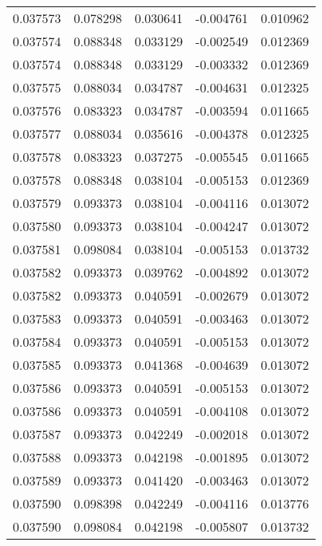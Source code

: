 \begin{tabular}{lrrrr}
0.037573    &  0.078298 &  0.030641 & -0.004761 &             0.010962 \\
0.037574    &  0.088348 &  0.033129 & -0.002549 &             0.012369 \\
0.037574    &  0.088348 &  0.033129 & -0.003332 &             0.012369 \\
0.037575    &  0.088034 &  0.034787 & -0.004631 &             0.012325 \\
0.037576    &  0.083323 &  0.034787 & -0.003594 &             0.011665 \\
0.037577    &  0.088034 &  0.035616 & -0.004378 &             0.012325 \\
0.037578    &  0.083323 &  0.037275 & -0.005545 &             0.011665 \\
0.037578    &  0.088348 &  0.038104 & -0.005153 &             0.012369 \\
0.037579    &  0.093373 &  0.038104 & -0.004116 &             0.013072 \\
0.037580    &  0.093373 &  0.038104 & -0.004247 &             0.013072 \\
0.037581    &  0.098084 &  0.038104 & -0.005153 &             0.013732 \\
0.037582    &  0.093373 &  0.039762 & -0.004892 &             0.013072 \\
0.037582    &  0.093373 &  0.040591 & -0.002679 &             0.013072 \\
0.037583    &  0.093373 &  0.040591 & -0.003463 &             0.013072 \\
0.037584    &  0.093373 &  0.040591 & -0.005153 &             0.013072 \\
0.037585    &  0.093373 &  0.041368 & -0.004639 &             0.013072 \\
0.037586    &  0.093373 &  0.040591 & -0.005153 &             0.013072 \\
0.037586    &  0.093373 &  0.040591 & -0.004108 &             0.013072 \\
0.037587    &  0.093373 &  0.042249 & -0.002018 &             0.013072 \\
0.037588    &  0.093373 &  0.042198 & -0.001895 &             0.013072 \\
0.037589    &  0.093373 &  0.041420 & -0.003463 &             0.013072 \\
0.037590    &  0.098398 &  0.042249 & -0.004116 &             0.013776 \\
0.037590    &  0.098084 &  0.042198 & -0.005807 &             0.013732 \\

\end{tabular}
